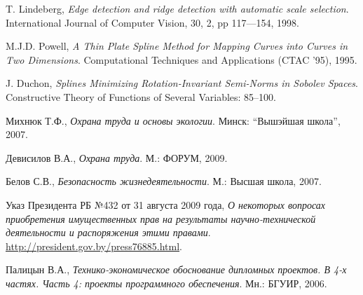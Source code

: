 \begin{thebibliography}{99}
  T. Lindeberg,
  \emph{Edge detection and ridge detection with automatic scale selection}.
  International Journal of Computer Vision, 30, 2, pp 117—154,
  1998.

  M.J.D. Powell,
  \emph{A Thin Plate Spline Method for Mapping Curves into Curves in Two Dimensions}.
  Computational Techniques and Applications (CTAC '95),
  1995.

  J. Duchon,
  \emph{Splines Minimizing Rotation-Invariant Semi-Norms in Sobolev Spaces}.
  Constructive Theory of Functions of Several Variables: 85–100.

  Михнюк Т.Ф.,
  \emph{Охрана труда и основы экологии}.
  Минск: ``Вышэйшая школа'',
  2007.

  Девисилов В.А.,
  \emph{Охрана труда}.
  М.: ФОРУМ,
  2009.

  Белов С.В.,
  \emph{Безопасность жизнедеятельности}.
  М.: Высшая школа,
  2007.

  Указ Президента РБ №432 от 31 августа 2009 года,
  \emph{О некоторых вопросах приобретения имущественных прав на результаты научно-технической деятельности и распоряжения этими правами}.
  \href{http://president.gov.by/press76885.html}{http://president.gov.by/press76885.html}.

  Палицын В.А.,
  \emph{Технико-экономическое обоснование дипломных проектов. В 4-х частях. Часть 4: проекты программного обеспечения}.
  Мн.: БГУИР,
  2006.

\end{thebibliography}

